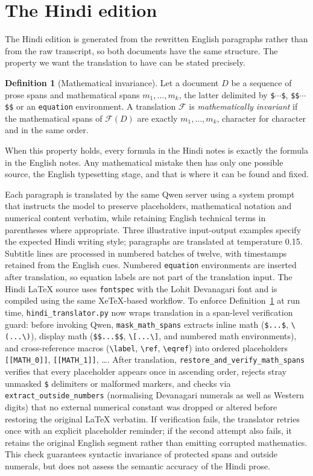 \documentclass[11pt,a4paper,oneside]{report}
\theoremstyle{definition}
\newtheorem{definition}{Definition}[chapter]
\newcommand{\code}[1]{\texttt{\small #1}}
\begin{document}
\section{The Hindi edition}
\label{sec:hindi}
The Hindi edition is generated from the rewritten English paragraphs rather than from the raw transcript, so both documents have the same structure. The property we want the translation to have can be stated precisely.

\begin{definition}[Mathematical invariance]
\label{def:math-invariance}
Let a document $D$ be a sequence of prose spans and mathematical spans $m_1,\dots,m_k$, the latter delimited by \verb|$|$\cdots$\verb|$|, \verb|$$|$\cdots$\verb|$$| or an \code{equation} environment. A translation $\mathcal{F}$ is \emph{mathematically invariant} if the mathematical spans of $\mathcal{F}(D)$ are exactly $m_1,\dots,m_k$, character for character and in the same order.
\end{definition}

When this property holds, every formula in the Hindi notes is exactly the formula in the English notes. Any mathematical mistake then has only one possible source, the English typesetting stage, and that is where it can be found and fixed.

Each paragraph is translated by the same Qwen server using a system prompt that instructs the model to preserve placeholders, mathematical notation and numerical content verbatim, while retaining English technical terms in parentheses where appropriate. Three illustrative input-output examples specify the expected Hindi writing style; paragraphs are translated at temperature 0.15. Subtitle lines are processed in numbered batches of twelve, with timestamps retained from the English cues. Numbered \code{equation} environments are inserted after translation, so equation labels are not part of the translation input. The Hindi LaTeX source uses \texttt{fontspec} with the Lohit Devanagari font and is compiled using the same XeTeX-based workflow. To enforce Definition~\ref{def:math-invariance} at run time, \code{hindi\_translator.py} now wraps translation in a span-level verification guard: before invoking Qwen, \code{mask\_math\_spans} extracts inline math (\verb|$...$|, \verb|\(...\)|), display math (\verb|$$...$$|, \verb|\[...\]|, and numbered math environments), and cross-reference macros (\verb|\label|, \verb|\ref|, \verb|\eqref|) into ordered placeholders \code{[[MATH\_0]]}, \code{[[MATH\_1]]}, \ldots. After translation, \code{restore\_and\_verify\_math\_spans} verifies that every placeholder appears once in ascending order, rejects stray unmasked \verb|$| delimiters or malformed markers, and checks via \code{extract\_outside\_numbers} (normalising Devanagari numerals as well as Western digits) that no external numerical constant was dropped or altered before restoring the original LaTeX verbatim. If verification fails, the translator retries once with an explicit placeholder reminder; if the second attempt also fails, it retains the original English segment rather than emitting corrupted mathematics. This check guarantees syntactic invariance of protected spans and outside numerals, but does not assess the semantic accuracy of the Hindi prose.
\end{document}
